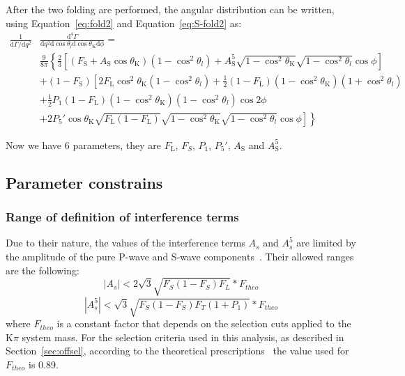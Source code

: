 After the two folding are performed, the angular distribution can be written, using  Equation~\ref{eq:fold2} and Equation~\ref{eq:S-fold2} as:
\begin{equation} \label{eq:PDF-f2}
  \begin{split}
    \frac{1}{\mathrm{d}\Gamma/\mathrm{d}q^2}&\frac{\mathrm{d}^4\Gamma}{\mathrm{d}q^2 \mathrm{d}\cos\theta_l \mathrm{d}\cos\theta_\mathrm{K} \mathrm{d}\phi} = \\
    &\frac{9}{8\pi}\left\{\frac{2}{3}\left[ (F_\mathrm{S}+A_\mathrm{S}\cos\theta_\mathrm{K})\left(1-\cos^2\theta_l\right) + A^5_\mathrm{S}\sqrt{1-\cos^2\theta_\mathrm{K}}\sqrt{1-\cos^2\theta_l}\cos\phi \right] \right.\\
    & + \left(1 - F_\mathrm{S}\right)\left[2F_\mathrm{L}\cos^2\theta_\mathrm{K}\left(1-\cos^2\theta_l\right)+\frac{1}{2}\left(1-F_\mathrm{L}\right)\left(1-\cos^2\theta_\mathrm{K}\right)\left(1+\cos^2\theta_l\right) \right.\\
      & + \frac{1}{2}P_1(1-F_\mathrm{L})(1-\cos^2\theta_\mathrm{K})(1-\cos^2\theta_l)\cos 2\phi \\
      & \left.\left. + 2P_5'\cos\theta_\mathrm{K}\sqrt{F_\mathrm{L}\left(1-F_\mathrm{L}\right)}\sqrt{1-\cos^2\theta_\mathrm{K}}\sqrt{1-\cos^2\theta_l}\cos\phi\right]\right\}
  \end{split}
\end{equation}

Now we have 6 parameters, they are $F_\mathrm{L}$, $F_S$, $P_1$, $P_5'$, $A_\mathrm{S}$ and $A^5_\mathrm{S}$.

\subsection{Parameter constrains}
\label{sec:bound}

\subsubsection{Range of definition of interference terms}
\label{sec:As5.range}
Due to their nature, the values of the interference terms $A_s$ and $A_s^5$ are limited by the amplitude of the pure P-wave and S-wave components~\cite{Genon:Swave}.
Their allowed ranges are the following:
\begin{equation} \label{eq:As.range}
  |A_s|<2\sqrt{3}\sqrt{F_S(1-F_S)F_L}*F_{theo}
\end{equation}
\begin{equation} \label{eq:As5.range}
  |A^5_s|<\sqrt{3}\sqrt{F_S(1-F_S)F_T(1+P_1)}*F_{theo}
\end{equation}
where $F_{theo}$ is a constant factor that depends on the selection cuts applied to the $\mathrm{K}\pi$ system mass.
For the selection criteria used in this analysis, as described in Section~\ref{sec:offsel}, according to the theoretical prescriptions~\cite{Genon:Swave} the value used for $F_{theo}$ is 0.89.

